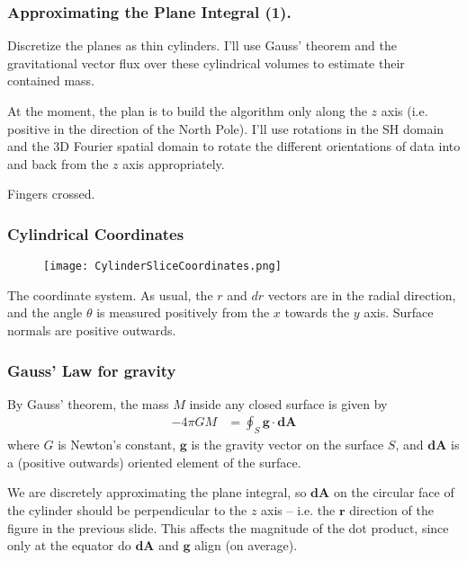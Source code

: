 \documentclass[aspectratio=43,serif,9pt]{beamer}
\newcommand{\vect}[1]{\boldsymbol{#1}}
\begin{document}
\begin{frame}
  \frametitle{Approximating the Plane Integral (1).}
  Discretize the planes as thin cylinders. I'll use Gauss' theorem and the gravitational vector flux over these cylindrical volumes to estimate their contained mass.

  At the moment, the plan is to build the algorithm only along the $z$ axis (i.e. positive in the direction of the North Pole). I'll use rotations in the SH domain and the 3D Fourier spatial domain to rotate the different orientations of data into and back from the $z$ axis appropriately.

  Fingers crossed.
\end{frame}

\begin{frame}

\frametitle{Cylindrical Coordinates}

\begin{figure}
\texttt{[image: CylinderSliceCoordinates.png]}
\end{figure}

The coordinate system. As usual, the $r$ and $dr$ vectors are in the radial direction, and the angle $\theta$ is measured positively from the $x$ towards the $y$ axis. Surface normals are positive outwards.
\end{frame}

\begin{frame}

  \frametitle{Gauss' Law for gravity}
  By Gauss' theorem, the mass $M$ inside any closed surface is given by
  \begin{align}
    -4 \pi G M &= \oint_{S} \vect{g} \cdot  \vect{dA} \label{eq:GaussLaw}
  \end{align}
  where $G$ is Newton's constant, $\vect{g}$ is the gravity vector on the surface $S$, and $\vect{dA}$ is a (positive outwards) oriented element of the surface.

  We are discretely approximating the plane integral, so $\vect{dA}$ on the circular face of the cylinder should be perpendicular to the $z$ axis -- i.e. the $\vect{r}$ direction of the figure in the previous slide. This affects the magnitude of the dot product, since only at the equator do $\vect{dA}$ and  $\vect{g}$ align (on average).
\end{frame}
\end{document}
